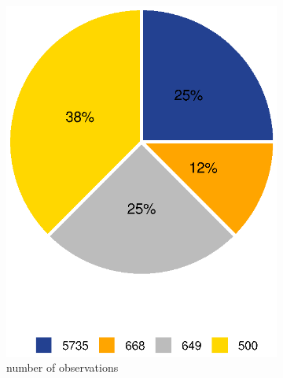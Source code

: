 \documentclass[12pt, oneside]{article}
\begin{document}
\begin{figure}[!htb]
\begin{subfigure}{.5\textwidth}
  \centering
  \includegraphics[width=1\linewidth]{../plot/obs_freq}
  \caption{number of observations}
\end{subfigure}%
\begin{subfigure}{.5\textwidth}
  \centering

\end{subfigure}
\end{figure}
\end{document}
